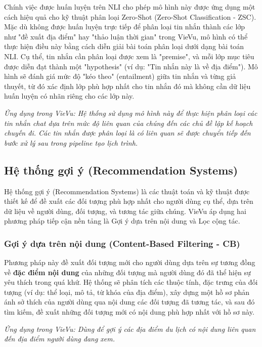 Chính việc được huấn luyện trên NLI cho phép mô hình này được ứng dụng một cách hiệu quả cho kỹ thuật phân loại Zero-Shot (Zero-Shot Classification - ZSC). Mặc dù không được huấn luyện trực tiếp để phân loại tin nhắn thành các lớp như "đề xuất địa điểm" hay "thảo luận thời gian" trong VieVu, mô hình có thể thực hiện điều này bằng cách diễn giải bài toán phân loại dưới dạng bài toán NLI. Cụ thể, tin nhắn cần phân loại được xem là "premise", và mỗi lớp mục tiêu được diễn đạt thành một "hypothesis" (ví dụ: "Tin nhắn này là về địa điểm"). Mô hình sẽ đánh giá mức độ "kéo theo" (entailment) giữa tin nhắn và từng giả thuyết, từ đó xác định lớp phù hợp nhất cho tin nhắn đó mà không cần dữ liệu huấn luyện có nhãn riêng cho các lớp này.

\textit{Ứng dụng trong VieVu: Hệ thống sử dụng mô hình này để thực hiện phân loại các tin nhắn chat dựa trên mức độ liên quan của chúng đến các chủ đề lập kế hoạch chuyến đi. Các tin nhắn được phân loại là có liên quan sẽ được chuyển tiếp đến bước xử lý sau trong pipeline tạo lịch trình.}

\subsection{Hệ thống gợi ý (Recommendation Systems)} 

Hệ thống gợi ý (Recommendation Systems) là các thuật toán và kỹ thuật được thiết kế để đề xuất các đối tượng phù hợp nhất cho người dùng cụ thể, dựa trên dữ liệu về người dùng, đối tượng, và tương tác giữa chúng. VieVu áp dụng hai phương pháp tiếp cận nền tảng là Gợi ý dựa trên nội dung và Lọc cộng tác.

\subsubsection{Gợi ý dựa trên nội dung (Content-Based Filtering - CB)\cite{cb_concept}} 
Phương pháp này đề xuất đối tượng mới cho người dùng dựa trên sự tương đồng về \textbf{đặc điểm nội dung} của những đối tượng mà người dùng đó đã thể hiện sự yêu thích trong quá khứ. Hệ thống sẽ phân tích các thuộc tính, đặc trưng của đối tượng (ví dụ: thể loại, mô tả, từ khóa của địa điểm), xây dựng một hồ sơ phản ánh sở thích của người dùng qua nội dung các đối tượng đã tương tác, và sau đó tìm kiếm, đề xuất những đối tượng mới có nội dung phù hợp nhất với hồ sơ này.

\textit{Ứng dụng trong VieVu: Dùng để gợi ý các địa điểm du lịch có nội dung liên quan đến địa điểm người dùng đang xem.}

